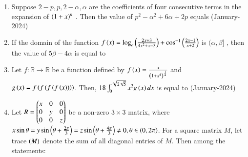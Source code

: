 \documentclass[journal]{IEEEtran}
\begin{document}
\begin{enumerate}
  \item Suppose $2-p, p, 2 - \alpha, \alpha$
 are the coefficients of four consecutive terms in the expansion of $\left(1 + x\right)^n$
. Then the value of $p^2 - \alpha^2 + 6\alpha + 2p$
 equals \hfill(January-2024)
 \begin{enumerate}
 \end{enumerate}
 \item If the domain of the function $f\left(x\right) = \log_e\left(\frac{2x +3}{4x^2 + x -3}\right) + \cos^{-1}\left(\frac{2x-1}{x+2}\right) $ is $ (\alpha, \beta ] $  , then the value of $5\beta - 4\alpha$
 is equal to
 \begin{enumerate}
 \end{enumerate}
 \item Let $f : \mathbb{R} \to \mathbb{R}$ be a function defined by $f\left(x\right) = \frac{x}{\left(1 + x^4\right) ^{\frac{1}{4}}}$ and $g\left(x\right) = f\left(f\left(f\left(f\left(x\right)\right)\right)\right)$. Then, $18 \int_0^{\sqrt{2\sqrt{5}}} x^2 g\left(x\right)dx$ is equal to \hfill(January-2024)
 \begin{enumerate}
 \end{enumerate}
 \item Let $R = \begin{pmatrix}x & 0 & 0 \\ 0 & y & 0 \\ 0 & 0 & z\end{pmatrix}$ be a non-zero $3 \times 3$ matrix, where $x\sin{\theta} = y \sin{\ensuremath{\left(\theta + \frac{2\pi}{3}\right)}} = z \sin{\ensuremath{\left(\theta + \frac{4\pi}{3}\right)}} \ne 0, \theta \in \left(0 , 2\pi\right)$. For a square matrix $M$, let trace $\left(M\right)$ denote the sum of all diagonal entries of $M$. Then among the statements: \\ \\

\end{enumerate}
\end{document}
